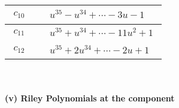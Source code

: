 \documentclass[1p]{elsarticle_modified}
\theoremstyle{definition}
\begin{document}
\begin{tabular}{m{50pt}|m{274pt}}
\hline $$\begin{aligned}c_{10}\end{aligned}$$&$\begin{aligned}
&u^{35}- u^{34}+\cdots-3 u-1
\end{aligned}$\\
\hline $$\begin{aligned}c_{11}\end{aligned}$$&$\begin{aligned}
&u^{35}+u^{34}+\cdots-11 u^2+1
\end{aligned}$\\
\hline $$\begin{aligned}c_{12}\end{aligned}$$&$\begin{aligned}
&u^{35}+2 u^{34}+\cdots-2 u+1
\end{aligned}$\\
\hline
\end{tabular}\\~\\
\newpage\renewcommand{\arraystretch}{1}
\flushleft \textbf{(v) Riley Polynomials at the component}\newline \\
\end{document}
